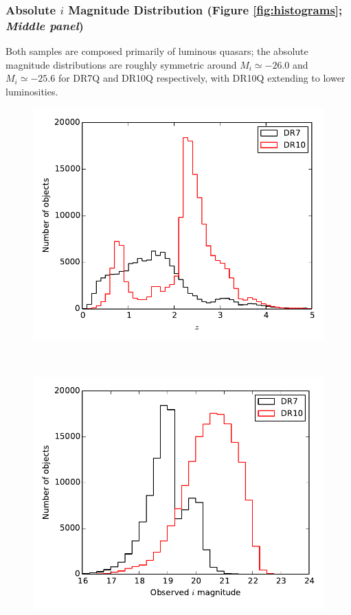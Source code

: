 \subsubsection{Absolute $i$ Magnitude Distribution (Figure \ref{fig:histograms}; {\it Middle panel})}

Both samples are composed primarily of luminous quasars; the absolute magnitude distributions are roughly symmetric around $M_i \simeq -26.0$ and $M_i \simeq -25.6$ for DR7Q and DR10Q respectively, with DR10Q extending to lower luminosities.  

\begin{figure}
  \centering
  \begin{minipage}[b]{0.5\textwidth}
    \includegraphics[width=\textwidth]{figures/chapter06/zhist}
  \end{minipage}\\
  \begin{minipage}[b]{0.5\textwidth}
    \includegraphics[width=\textwidth]{figures/chapter06/mihist}

\end{minipage}
\end{figure}
